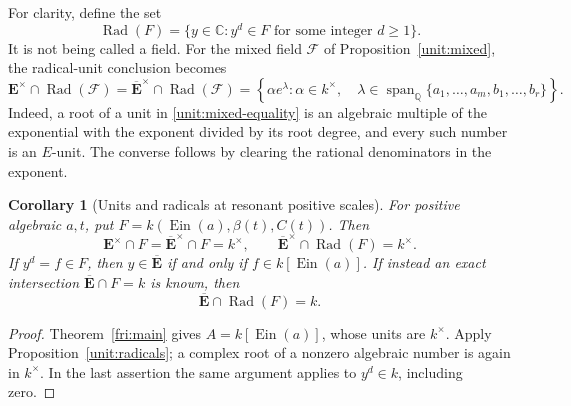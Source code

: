 \documentclass[11pt]{article}
\newtheorem{corollary}[theorem]{Corollary}
\theoremstyle{definition}
\theoremstyle{remark}
\newcommand{\E}{\mathbf E}
\newcommand{\Ebar}{\overline{\mathbf E}}
\newcommand{\Ein}{\operatorname{Ein}}
\begin{document}
For clarity, define the set
\[
 \operatorname{Rad}(F)=
 \{y\in\mathbb C:y^d\in F\text{ for some integer }d\ge1\}.
\]
It is not being called a field. For the mixed field $\mathcal F$
of Proposition~\ref{unit:mixed}, the radical-unit conclusion becomes
\begin{equation}\label{unit:rational-exponents}
 \E^\times\cap\operatorname{Rad}(\mathcal F)
 =\Ebar^\times\cap\operatorname{Rad}(\mathcal F)
 =\left\{\alpha e^\lambda:
       \alpha\in k^\times,\quad
       \lambda\in\operatorname{span}_{\mathbb Q}
                    \{a_1,\ldots,a_m,b_1,\ldots,b_r\}\right\}.
\end{equation}
Indeed, a root of a unit in \eqref{unit:mixed-equality} is an
algebraic multiple of the exponential with the exponent divided by its
root degree, and every such number is an $E$-unit. The converse follows
by clearing the rational denominators in the exponent.

\begin{corollary}[Units and radicals at resonant positive scales]
\label{unit:resonant}
For positive algebraic $a,t$, put
$F=k(\Ein(a),\beta(t),C(t))$. Then
\[
 \E^\times\cap F=\Ebar^\times\cap F=k^\times,
 \qquad
 \Ebar^\times\cap\operatorname{Rad}(F)=k^\times.
\]
If $y^d=f\in F$, then $y\in\Ebar$ if and only if
$f\in k[\Ein(a)]$. If instead an exact intersection
$\Ebar\cap F=k$ is known, then
\[
                  \Ebar\cap\operatorname{Rad}(F)=k.
\]
\end{corollary}
\begin{proof}
Theorem~\ref{fri:main} gives $A=k[\Ein(a)]$, whose units are
$k^\times$. Apply Proposition~\ref{unit:radicals}; a complex root
of a nonzero algebraic number is again in $k^\times$. In the last
assertion the same argument applies to $y^d\in k$, including zero.
\end{proof}
\end{document}
